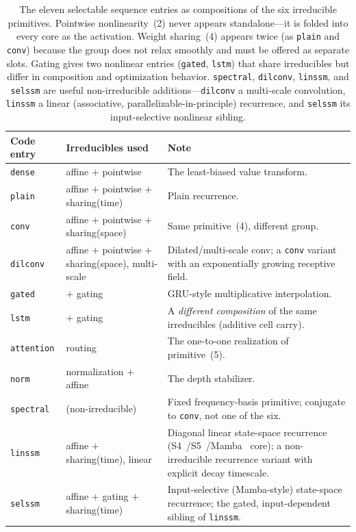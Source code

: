\documentclass[11pt]{article}
\newcommand{\allowbreakhere}{\discretionary{}{}{}}
\newcommand{\code}[1]{\texttt{\def\_{\char`_\allowbreakhere}#1}}
\begin{document}
\begin{table}[h]
\centering
\small
\renewcommand{\arraystretch}{1.2}
\begin{tabular}{p{3.0cm} p{3.4cm} p{6.4cm}}
\toprule
\textbf{Code entry} & \textbf{Irreducibles used} & \textbf{Note}\\
\midrule
\code{dense}     & affine $+$ pointwise & The least-biased value transform.\\
\code{plain}     & affine $+$ pointwise $+$ sharing(time) & Plain recurrence.\\
\code{conv}      & affine $+$ pointwise $+$ sharing(space) & Same primitive~(4), different group.\\
\code{dilconv}   & affine $+$ pointwise $+$ sharing(space), multi-scale & Dilated/multi-scale conv; a \code{conv} variant with an exponentially growing receptive field.\\
\code{gated}     & $+$ gating & GRU-style multiplicative interpolation.\\
\code{lstm}      & $+$ gating & A \emph{different composition} of the same irreducibles (additive cell carry).\\
\code{attention} & routing & The one-to-one realization of primitive~(5).\\
\code{norm}      & normalization $+$ affine & The depth stabilizer.\\
\code{spectral}  & (non-irreducible) & Fixed frequency-basis primitive; conjugate to \code{conv}, not one of the six.\\
\code{linssm}    & affine $+$ sharing(time), linear & Diagonal linear state-space recurrence (S4~\cite{gu2022s4}/S5~\cite{smith2023s5}/Mamba~\cite{gu2023mamba} core); a non-irreducible recurrence variant with explicit decay timescale.\\
\code{selssm}    & affine $+$ gating $+$ sharing(time) & Input-selective (Mamba-style) state-space recurrence; the gated, input-dependent sibling of \code{linssm}.\\
\bottomrule
\end{tabular}
\caption{The eleven selectable sequence entries as compositions of the six irreducible primitives.
Pointwise nonlinearity~(2) never appears standalone---it is folded into every core as the
activation. Weight sharing~(4) appears twice (as \code{plain} and \code{conv}) because the
group does not relax smoothly and must be offered as separate slots. Gating gives two nonlinear entries
(\code{gated}, \code{lstm}) that share irreducibles but differ in composition and optimization
behavior. \code{spectral}, \code{dilconv}, \code{linssm}, and \code{selssm} are useful non-irreducible
additions---\code{dilconv} a multi-scale convolution, \code{linssm} a linear (associative,
parallelizable-in-principle) recurrence, and \code{selssm} its input-selective nonlinear sibling.}
\label{tab:vocab}
\end{table}
\end{document}
